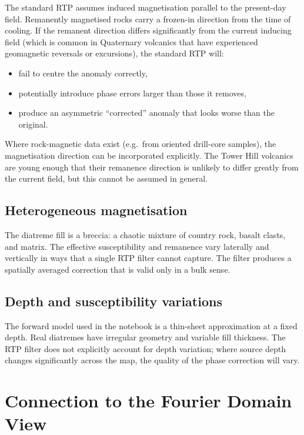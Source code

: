 \documentclass[11pt,a4paper]{article}
\begin{document}
The standard RTP assumes induced magnetisation parallel to the present-day
field.
Remanently magnetised rocks carry a frozen-in direction from the time of
cooling.
If the remanent direction differs significantly from the current inducing
field (which is common in Quaternary volcanics that have experienced
geomagnetic reversals or excursions), the standard RTP will:
\begin{itemize}
  \item fail to centre the anomaly correctly,
  \item potentially introduce phase errors larger than those it removes,
  \item produce an asymmetric ``corrected'' anomaly that looks worse than the
        original.
\end{itemize}
Where rock-magnetic data exist (e.g.\ from oriented drill-core samples),
the magnetisation direction can be incorporated explicitly.
The Tower Hill volcanics are young enough that their remanence direction
is unlikely to differ greatly from the current field, but this cannot be
assumed in general.

\subsection{Heterogeneous magnetisation}

The diatreme fill is a breccia: a chaotic mixture of country rock, basalt
clasts, and matrix.
The effective susceptibility and remanence vary laterally and vertically
in ways that a single RTP filter cannot capture.
The filter produces a spatially averaged correction that is valid only in
a bulk sense.

\subsection{Depth and susceptibility variations}

The forward model used in the notebook is a thin-sheet approximation at
a fixed depth.
Real diatremes have irregular geometry and variable fill thickness.
The RTP filter does not explicitly account for depth variation;
where source depth changes significantly across the map, the quality of the
phase correction will vary.

\section{Connection to the Fourier Domain View}
\end{document}
